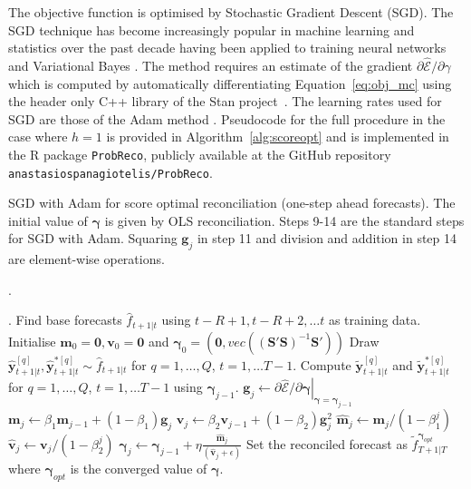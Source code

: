 \documentclass[12pt]{article}
\theoremstyle{definition}
\begin{document}
The objective function is optimised by Stochastic Gradient Descent (SGD). The SGD technique has become increasingly popular in machine learning and statistics over the past decade having been applied to training neural networks \citep{bottou2010} and Variational Bayes \citep{kingma2013}.  The method requires an estimate of the gradient $\partial\hat{\mathcal{E}}/\partial{\gamma}$ which is computed by automatically differentiating Equation~\ref{eq:obj_mc} using the header only C++ library of the Stan project~\citep{carpenter2015}.  The learning rates used for SGD are those of the Adam method \citep[see][for details]{kingma2014}.  Pseudocode for the full procedure in the case where $h=1$ is provided in Algorithm~\ref{alg:scoreopt} and is implemented in the R package \texttt{ProbReco}, publicly available at the GitHub repository \texttt{anastasiospanagiotelis/ProbReco}.

\begin{algorithm}
	\caption{SGD with Adam for score optimal reconciliation (one-step ahead forecasts).  The initial value of $\bm{\gamma}$ is given by OLS reconciliation.  Steps 9-14 are the standard steps for SGD with Adam.  Squaring $\bm{g}_j$ in step 11 and division and addition in step 14 are element-wise operations.}\label{alg:scoreopt}.
	\begin{algorithmic}[1]
		.
		  \State Find base forecasts $\hat{f}_{t+1|t}$ using $t-R+1,t-R+2,\ldots t$ as training data.		
		\EndFor
		\State Initialise $\bm{m}_0=\bm{0}, \bm{v}_0=\bm{0}$ and $\bm{\gamma}_0=\left(\bm{0},vec\left((\bm{S}'\bm{S})^{-1}\bm{S}'\right)\right)$ 
		\State Draw ${\hat{\bm{y}}}^{[q]}_{t+1|t},{\hat{\bm{y}}}^{*[q]}_{t+1|t}\sim \hat{f}_{t+1|t}$ for $q=1,\ldots,Q$, $t=1,\ldots T-1$.
		\State Compute $\tilde{\bm{y}}^{[q]}_{t+1|t}$ and $\tilde{\bm{y}}^{*[q]}_{t+1|t}$ for $q=1,\ldots,Q$, $t=1,\ldots T-1$ using $\bm{\gamma}_{j-1}$.
		\State $\bm{g}_j \gets \left.\partial\hat{\mathcal{E}}/\partial{\bm{\gamma}}\right|_{\bm{\gamma}=\bm{\gamma}_{j-1}}$ 
		\State $\bm{m}_j\gets\beta_1\bm{m}_{j-1}+(1-\beta_1)\bm{g}_j$ 
		\State $\bm{v}_j\gets\beta_2\bm{v}_{j-1}+(1-\beta_2)\bm{g}^2_j$ 
		\State $\hat{\bm{m}}_j\gets \bm{m}_j/(1-\beta_1^j)$ 
		\State $\hat{\bm{v}}_j\gets \bm{v}_j/(1-\beta_2^j)$ 
		\State $\bm{\gamma}_j\gets\bm{\gamma}_{j-1}+\eta\frac{\hat{\bm{m}}_j}{(\hat{\bm{v}}_j+\epsilon)}$ 
		\EndFor
		\State Set the reconciled forecast as $\tilde{f}^{\bm{\gamma}_{opt}}_{T+1|T}$ where $\bm{\gamma}_{opt}$ is the converged value of $\bm{\gamma}$.
		\EndProcedure
	\end{algorithmic}
\end{algorithm}
\end{document}
